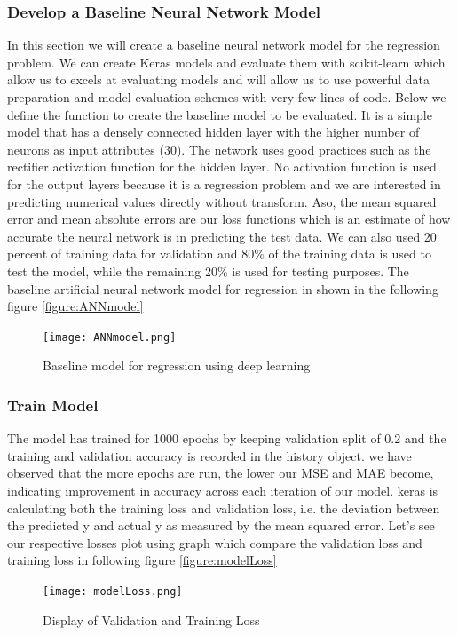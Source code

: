 \subsubsection{Develop a Baseline Neural Network Model}
In this section we will create a baseline neural network model for the regression problem. We can create Keras models and evaluate them with scikit-learn which allow us to excels at evaluating models and will allow us to use powerful data preparation and model evaluation schemes with very few lines of code.\newline
Below we define the function to create the baseline model to be evaluated. It is a simple model that has a densely connected hidden layer with the higher number of neurons as input attributes (30). The network uses good practices such as the rectifier activation function for the hidden layer. No activation function is used for the output layers because it is a regression problem and we are interested in predicting numerical values directly without transform.\newline
Aso, the mean squared error and mean absolute errors are our loss functions which is an estimate of how accurate the neural network is in predicting the test data. We can also used 20 percent of training data for validation and 80\% of the training data is used to test the model, while the remaining 20\% is used for testing purposes.\newline
The baseline artificial neural network model for regression in shown in the following figure \autoref{figure:ANNmodel} \newline
\begin{figure}[H]
\begin{center}
\texttt{[image: ANNmodel.png]}
\end{center}
\caption{Baseline model for regression using deep learning }
\label{figure:ANNmodel}
\end{figure}
\subsubsection{Train Model}
The model has trained for 1000 epochs by keeping validation split of 0.2 and the training and validation accuracy is recorded in the history object.
we have observed that the more epochs are run, the lower our MSE and MAE become, indicating improvement in accuracy across each iteration of our model.\newline
keras is calculating both the training loss and validation loss, i.e. the deviation between the predicted y and actual y as measured by the mean squared error. Let’s see our respective losses plot using graph which compare the validation loss and training loss in following figure \autoref{figure:modelLoss} \newline
\begin{figure}[H]
\begin{center}
\texttt{[image: modelLoss.png]}
\end{center}
\caption{Display of Validation and Training Loss }
\label{figure:modelLoss}
\end{figure}
